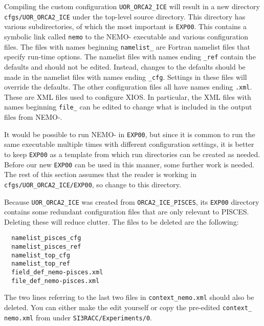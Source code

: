 Compiling the custom configuration \verb|UOR_ORCA2_ICE| will result in a new directory \verb|cfgs/UOR_ORCA2_ICE| under the top-level source directory.
This directory has various subdirectories, of which the most important is \verb|EXP00|.
This contains a symbolic link called \verb|nemo| to the NEMO-\SIcu{} executable and various configuration files.
The files with names beginning \verb|namelist_| are Fortran namelist files that specify run-time options.
The namelist files with names ending \verb|_ref| contain the defaults and should not be edited.
Instead, changes to the defaults should be made in the namelist files with names ending \verb|_cfg|.
Settings in these files will override the defaults.
The other configuration files all have names ending \verb|.xml|.
These are XML files used to configure XIOS. In particular, the XML files with names beginning \verb|file_| can be edited to change what is included in the output files from NEMO-\SIcu{}.

It would be possible to run NEMO-\SIcu{} in \verb|EXP00|, but since it is common to run the same executable multiple times with different configuration settings, it is better to keep \verb|EXP00| as a template from which run directories can be created as needed.
Before our new \verb|EXP00| can be used in this manner, some further work is needed.
The rest of this section assumes that the reader is working in \verb|cfgs/UOR_ORCA2_ICE/EXP00|, so change to this directory.

Because \verb|UOR_ORCA2_ICE| was created from \verb|ORCA2_ICE_PISCES|, its \verb|EXP00| directory contains some redundant configuration files that are only relevant to PISCES.
Deleting these will reduce clutter.
The files to be deleted are the following:

\begin{verbatim}
  namelist_pisces_cfg
  namelist_pisces_ref
  namelist_top_cfg
  namelist_top_ref
  field_def_nemo-pisces.xml
  file_def_nemo-pisces.xml
\end{verbatim}

\noindent{}The two lines referring to the last two files in \verb|context_nemo.xml| should also be deleted.
You can either make the edit yourself or copy the pre-edited \verb|context_| \verb|nemo.xml| from under \verb|SI3RACC/Experiments/0|.

